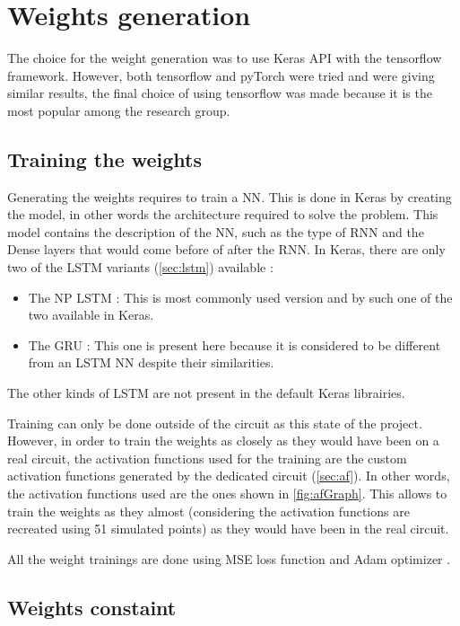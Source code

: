 \section{Weights generation}
\label{sec:genwei}

The choice for the weight generation was to use Keras API with the tensorflow framework. However, both tensorflow and pyTorch were tried and were giving similar results, the final choice of using tensorflow was made because it is the most popular among the research group.

\subsection{Training the weights}

Generating the weights requires to train a \ac{NN}. This is done in Keras by creating the model, in other words the architecture required to solve the problem. This model contains the description of the \ac{NN}, such as the type of \ac{RNN} and the Dense layers that would come before of after the \ac{RNN}. In Keras, there are only two of the \ac{LSTM} variants (\cref{sec:lstm}) available :

\begin{itemize}
  \item The \ac{NP} \ac{LSTM} : This is most commonly used version and by such one of the two available in Keras.
  \item The \ac{GRU} : This one is present here because it is considered to be different from an \ac{LSTM} \ac{NN} despite their similarities.
\end{itemize}

The other kinds of \ac{LSTM} are not present in the default Keras librairies.

Training can only be done outside of the circuit as this state of the project. However, in order to train the weights as closely as they would have been on a real circuit, the activation functions used for the training are the custom activation functions generated by the dedicated circuit (\cref{sec:af}). In other words, the activation functions used are the ones shown in \cref{fig:afGraph}. This allows to train the weights as they almost (considering the activation functions are recreated using 51 simulated points) as they would have been in the real circuit.

All the weight trainings are done using \ac{MSE} loss function and Adam optimizer \cite{adamOpti}.

\subsection{Weights constaint}

